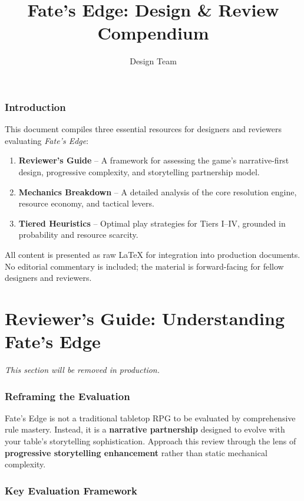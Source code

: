 \documentclass[11pt]{article}
\title{Fate's Edge: Design \& Review Compendium}
\author{Design Team}
\date{}
\begin{document}
\maketitle
\tableofcontents
\newpage

\section*{Introduction}
This document compiles three essential resources for designers and reviewers evaluating \textit{Fate's Edge}:
\begin{enumerate}
    \item \textbf{Reviewer's Guide} -- A framework for assessing the game's narrative-first design, progressive complexity, and storytelling partnership model.
    \item \textbf{Mechanics Breakdown} -- A detailed analysis of the core resolution engine, resource economy, and tactical levers.
    \item \textbf{Tiered Heuristics} -- Optimal play strategies for Tiers I--IV, grounded in probability and resource scarcity.
\end{enumerate}

All content is presented as raw LaTeX for integration into production documents. No editorial commentary is included; the material is forward-facing for fellow designers and reviewers.

\newpage

\part{Reviewer's Guide: Understanding Fate's Edge}

\textit{This section will be removed in production.}


\section{Reframing the Evaluation}

Fate's Edge is not a traditional tabletop RPG to be evaluated by comprehensive rule mastery. Instead, it is a \textbf{narrative partnership} designed to evolve with your table's storytelling sophistication. Approach this review through the lens of \textbf{progressive storytelling enhancement} rather than static mechanical complexity.

\section{Key Evaluation Framework}
\end{document}
